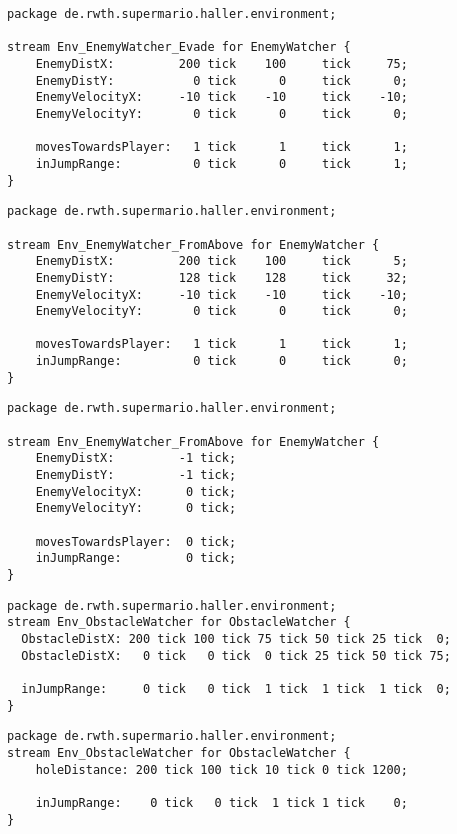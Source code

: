 \begin{lstlisting}[label=lst:enemywatchertest_1, caption=Enemy watcher stream test]
package de.rwth.supermario.haller.environment;

stream Env_EnemyWatcher_Evade for EnemyWatcher {
    EnemyDistX:         200 tick    100     tick     75;
    EnemyDistY:           0 tick      0     tick      0;
    EnemyVelocityX:     -10 tick    -10     tick    -10;
    EnemyVelocityY:       0 tick      0     tick      0;
            
    movesTowardsPlayer:   1 tick      1     tick      1;
    inJumpRange:          0 tick      0     tick      1;
}
\end{lstlisting}

\begin{lstlisting}[label=lst:enemywatchertest_2, caption=Enemy watcher stream test]
package de.rwth.supermario.haller.environment;

stream Env_EnemyWatcher_FromAbove for EnemyWatcher {
    EnemyDistX:         200 tick    100     tick      5;
    EnemyDistY:         128 tick    128     tick     32;
    EnemyVelocityX:     -10 tick    -10     tick    -10;
    EnemyVelocityY:       0 tick      0     tick      0;
            
    movesTowardsPlayer:   1 tick      1     tick      1;
    inJumpRange:          0 tick      0     tick      0;
}
\end{lstlisting}

\begin{lstlisting}[label=lst:enemywatchertest_3, caption=Enemy watcher stream test]
package de.rwth.supermario.haller.environment;

stream Env_EnemyWatcher_FromAbove for EnemyWatcher {
    EnemyDistX:         -1 tick;
    EnemyDistY:         -1 tick;
    EnemyVelocityX:      0 tick;
    EnemyVelocityY:      0 tick;
            
    movesTowardsPlayer:  0 tick;
    inJumpRange:         0 tick;
}
\end{lstlisting}
\pagebreak

\begin{lstlisting}[label=lst:obstaclewatchertest, caption=Obstacle watcher stream test]
package de.rwth.supermario.haller.environment;
stream Env_ObstacleWatcher for ObstacleWatcher {
  ObstacleDistX: 200 tick 100 tick 75 tick 50 tick 25 tick  0;
  ObstacleDistX:   0 tick   0 tick  0 tick 25 tick 50 tick 75;
    
  inJumpRange:     0 tick   0 tick  1 tick  1 tick  1 tick  0;
}
\end{lstlisting}

\begin{lstlisting}[label=lst:holewatchertest, caption=Hole watcher stream test]
package de.rwth.supermario.haller.environment;
stream Env_ObstacleWatcher for ObstacleWatcher {
    holeDistance: 200 tick 100 tick 10 tick 0 tick 1200;
    
    inJumpRange:    0 tick   0 tick  1 tick	1 tick    0;
}
\end{lstlisting}